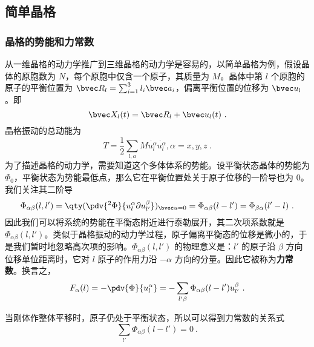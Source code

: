 
\subsection{简单晶格}
\subsubsection{晶格的势能和力常数}
从一维晶格的动力学推广到三维晶格的动力学是容易的，以简单晶格为例，假设晶体的原胞数为 $N$，每个原胞中仅含一个原子，其质量为 $M$。晶体中第 $l$ 个原胞的原子的平衡位置为 $\bvec R_l=\sum_{i=1}^3 l_i\bvec a_i$，偏离平衡位置的位移为 $\bvec u_l$。即
\begin{equation}
\bvec X_l(t)=\bvec R_l+\bvec u_l(t)~.
\end{equation}
晶格振动的总动能为
\begin{equation}
T=\frac{1}{2}\sum_{l,a} M \dot{u_l^\alpha}\dot{u_l^\alpha},\alpha=x,y,z~.
\end{equation}
为了描述晶格的动力学，需要知道这个多体体系的势能。设平衡状态晶体的势能为 $\Phi_0$，平衡状态为势能最低点，那么它在平衡位置处关于原子位移的一阶导也为 $0$。我们关注其二阶导
\begin{equation}
\Phi_{\alpha\beta}(l,l')=\qty(\pdv{^2\Phi}{u_l^\alpha\partial u_{l'}^\beta})_{\bvec u=0}=\Phi_{\alpha\beta}(l-l')=\Phi_{\beta\alpha}(l'-l)~.
\end{equation}
因此我们可以将系统的势能在平衡态附近进行泰勒展开，其二次项系数就是 $\Phi_{\alpha\beta}(l,l')$。类似于晶格振动的动力学过程，原子偏离平衡态的位移是微小的，于是我们暂时地忽略高次项的影响。$\Phi_{\alpha\beta}(l,l')$ 的物理意义是：$l'$ 的原子沿 $\beta$ 方向位移单位距离时，它对 $l$ 原子的作用力沿 $-\alpha$ 方向的分量。因此它被称为\textbf{力常数}。换言之，
\begin{equation}\label{eq_latdyn_1}
F_\alpha(l)=-\pdv{\Phi}{u_l^\alpha}=-\sum_{l'\beta}\Phi_{\alpha\beta}(l-l')u_{l'}^\beta~.
\end{equation}

当刚体作整体平移时，原子仍处于平衡状态，所以可以得到力常数的关系式
\begin{equation}
\sum_{l'}\Phi_{\alpha\beta}(l-l')=0~.
\end{equation}
